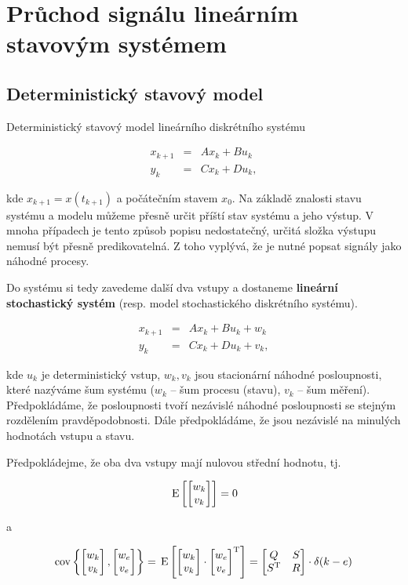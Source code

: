 \chapter{Průchod signálu lineárním stavovým systémem}
\section{Deterministický stavový model}
Deterministický stavový model lineárního diskrétního systému

\begin{eqnarray*}
x_{k+1} & = & Ax_k + Bu_k\\
y_k & = & Cx_k + Du_k,
\end{eqnarray*}

kde $x_{k+1}=x(t_{k+1})$ a počátečním stavem $x_0$. Na základě znalosti stavu systému a modelu můžeme přesně určit příští stav systému a jeho výstup. V mnoha případech je tento způsob popisu nedostatečný, určitá složka výstupu nemusí být přesně predikovatelná. Z toho vyplývá, že je nutné popsat signály jako náhodné procesy.

\tab Do systému si tedy zavedeme další dva vstupy a dostaneme \textbf{lineární stochastický systém} (resp. model stochastického diskrétního systému).

\begin{eqnarray*}
x_{k+1} & = & Ax_k + Bu_k + w_k\\
y_k & = & Cx_k + Du_k + v_k,
\end{eqnarray*}

kde $u_k$ je deterministický vstup, $w_k, v_k$ jsou stacionární náhodné posloupnosti, které nazýváme šum systému ($w_k$ -- šum procesu (stavu), $v_k$ -- šum měření). Předpokládáme, že posloupnosti tvoří nezávislé náhodné posloupnosti se stejným rozdělením pravděpodobnosti. Dále předpokládáme, že jsou nezávislé na minulých hodnotách vstupu a stavu.\br

Předpokládejme, že oba dva vstupy mají nulovou střední hodnotu, tj.

\[ \,\mathrm{E}\left[
\begin{bmatrix}
w_k \\ v_k
\end{bmatrix}
\right] = 0 \]

a 

\[
\mathrm{cov}\left\{ \begin{bmatrix}w_k \\ v_k\end{bmatrix},\begin{bmatrix}w_e \\ v_e\end{bmatrix} \right\}
=\,\mathrm{E}\left[ \begin{bmatrix}w_k \\ v_k\end{bmatrix} \cdot \begin{bmatrix}w_e \\ v_e\end{bmatrix}^{\mathrm{T}}  \right] =
\begin{bmatrix}
Q & S\\ S^{\mathrm{T}} & R
\end{bmatrix}\cdot\delta(k-e)
\]

